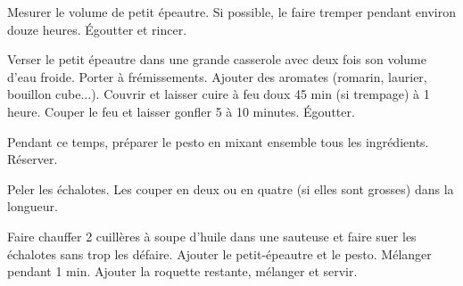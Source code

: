 \begin{etapes}
\item Mesurer le volume de petit épeautre. Si possible, le faire tremper pendant environ douze heures. Égoutter et rincer. 
\item Verser le petit épeautre dans une grande casserole avec deux fois son volume d'eau froide. Porter à frémissements. Ajouter des aromates (romarin, laurier, bouillon cube...). Couvrir et laisser cuire à feu doux 45 min (si trempage) à 1 heure. Couper le feu et laisser gonfler 5 à 10 minutes. Égoutter.
\item Pendant ce temps, préparer le pesto en mixant ensemble tous les ingrédients. Réserver.
\item Peler les échalotes. Les couper en deux ou en quatre (si elles sont grosses) dans la longueur.
\item Faire chauffer 2 cuillères à soupe d’huile dans une sauteuse et faire suer les échalotes sans trop les défaire. Ajouter le petit-épeautre et le pesto. Mélanger pendant 1 min. Ajouter la roquette restante, mélanger et servir.
\end{etapes}
\begin{conseils}
\end{conseils}

